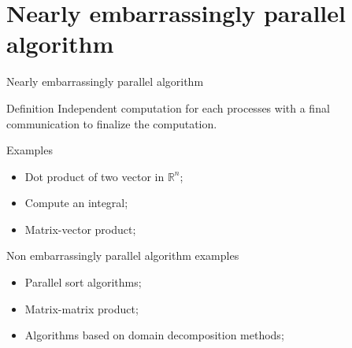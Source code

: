\documentclass[compress,10pt,aspectratio=169]{beamer}
\begin{document}
\section{Nearly embarrassingly parallel algorithm}

\begin{frame}[fragile]{Nearly embarrassingly parallel algorithm}
    \scriptsize
    \begin{block}{\small Definition}
        Independent computation for each processes with a final communication to finalize the computation.
    \end{block}

    \begin{exampleblock}{\small Examples}
        \begin{itemize}
            \item Dot product of two vector in $\mathbb{R}^{n}$;
            \item Compute an integral;
            \item Matrix-vector product;
        \end{itemize}
    \end{exampleblock}

    \begin{alertblock}{\small Non embarrassingly parallel algorithm examples}
      \begin{itemize}
      \item Parallel sort algorithms;
      \item Matrix-matrix product;
      \item Algorithms based on domain decomposition methods;
      \end{itemize}
    \end{alertblock}
\end{frame}
\end{document}
